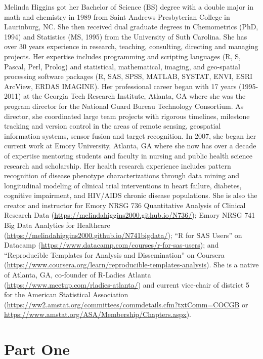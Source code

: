 \documentclass[
]{book}
\begin{document}

Melinda Higgins got her Bachelor of Science (BS) degree with a double major in math and chemistry in 1989 from Saint Andrews Presbyterian College in Laurinburg, NC. She then received dual graduate degrees in Chemometrics (PhD, 1994) and Statistics (MS, 1995) from the University of Suth Carolina. She has over 30 years experience in research, teaching, consulting, directing and managing projects. Her expertise includes programming and scripting languages (R, S, Pascal, Perl, Prolog) and statistical, mathematical, imaging, and geo-spatial processing software packages (R, SAS, SPSS, MATLAB, SYSTAT, ENVI, ESRI ArcView, ERDAS IMAGINE). Her professional career began with 17 years (1995-2011) at the Georgia Tech Research Institute, Atlanta, GA where she was the program director for the National Guard Bureau Technology Consortium. As director, she coordinated large team projects with rigorous timelines, milestone tracking and version control in the areas of remote sensing, geospatial information systems, sensor fusion and target recognition. In 2007, she began her current work at Emory University, Atlanta, GA where she now has over a decade of expertise mentoring students and faculty in nursing and public health science research and scholarship. Her health research experience includes pattern recognition of disease phenotype characterizations through data mining and longitudinal modeling of clinical trial interventions in heart failure, diabetes, cognitive impairment, and HIV/AIDS chronic disease populations. She is also the creator and instructor for Emory NRSG 736 Quantitative Analysis of Clinical Research Data (\url{https://melindahiggins2000.github.io/N736/}); Emory NRSG 741 Big Data Analytics for Healthcare (\url{https://melindahiggins2000.github.io/N741bigdata/}); ``R for SAS Users'' on Datacamp (\url{https://www.datacamp.com/courses/r-for-sas-users}); and ``Reproducible Templates for Analysis and Dissemination'' on Coursera (\url{https://www.coursera.org/learn/reproducible-templates-analysis}). She is a native of Atlanta, GA, co-founder of R-Ladies Atlanta (\url{https://www.meetup.com/rladies-atlanta/}) and current vice-chair of district 5 for the American Statistical Association (\url{https://ww2.amstat.org/committees/commdetails.cfm?txtComm=COCGB} or \url{https://www.amstat.org/ASA/Membership/Chapters.aspx}).

\mainmatter

\hypertarget{part-part-one}{%
\part{Part One}\label{part-part-one}}
\end{document}
